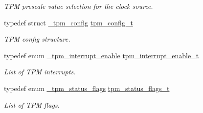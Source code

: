 \begin{DoxyCompactItemize}
\begin{DoxyCompactList}\small\item\em T\+PM prescale value selection for the clock source. \end{DoxyCompactList}\item 
typedef struct \mbox{\hyperlink{struct__tpm__config}{\+\_\+tpm\+\_\+config}} \mbox{\hyperlink{group__tpm_ga5647039a18486c876df5cdeb84c9621d}{tpm\+\_\+config\+\_\+t}}
\begin{DoxyCompactList}\small\item\em T\+PM config structure. \end{DoxyCompactList}\item 
\mbox{\label{group__tpm_ga95c8edaff8d8b474bf4796b16413cc16}} 
typedef enum \mbox{\hyperlink{group__tpm_ga5974278413cf04de350a256f4fb6ad2c}{\+\_\+tpm\+\_\+interrupt\+\_\+enable}} \mbox{\hyperlink{group__tpm_ga95c8edaff8d8b474bf4796b16413cc16}{tpm\+\_\+interrupt\+\_\+enable\+\_\+t}}
\begin{DoxyCompactList}\small\item\em List of T\+PM interrupts. \end{DoxyCompactList}\item 
\mbox{\label{group__tpm_gaf74093252aa505452b3d64d3b7f56384}} 
typedef enum \mbox{\hyperlink{group__tpm_ga8ebc3984cb11aef22f97788dc996620f}{\+\_\+tpm\+\_\+status\+\_\+flags}} \mbox{\hyperlink{group__tpm_gaf74093252aa505452b3d64d3b7f56384}{tpm\+\_\+status\+\_\+flags\+\_\+t}}
\begin{DoxyCompactList}\small\item\em List of T\+PM flags. \end{DoxyCompactList}\end{DoxyCompactItemize}
